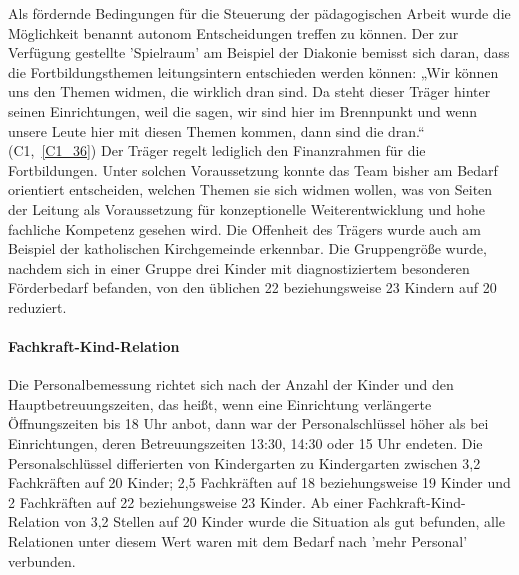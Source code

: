 Als fördernde Bedingungen für die Steuerung der pädagogischen Arbeit wurde die Möglichkeit benannt autonom Entscheidungen treffen zu können. 
Der zur Verfügung gestellte 'Spielraum' am Beispiel der Diakonie bemisst sich daran, dass die Fortbildungsthemen leitungsintern entschieden werden können: „Wir können uns den Themen widmen, die wirklich dran sind. Da steht dieser Träger hinter seinen Einrichtungen, weil die sagen, wir sind hier im Brennpunkt und wenn unsere Leute hier mit diesen Themen kommen, dann sind die dran.“ (C1,~\ref{C1_36}) Der Träger regelt lediglich den Finanzrahmen für die Fortbildungen. Unter solchen Voraussetzung konnte das Team bisher am Bedarf orientiert entscheiden, welchen Themen sie sich widmen wollen, was von Seiten der Leitung als Voraussetzung für konzeptionelle Weiterentwicklung und hohe fachliche Kompetenz gesehen wird. 
Die Offenheit des Trägers wurde auch am Beispiel der katholischen Kirchgemeinde erkennbar. Die Gruppengröße wurde, nachdem sich in einer Gruppe drei Kinder mit diagnostiziertem besonderen Förderbedarf befanden, von den üblichen 22 beziehungsweise 23 Kindern auf 20 reduziert. 

\paragraph{Fachkraft-Kind-Relation}
Die Personalbemessung richtet sich nach der Anzahl der Kinder und den Hauptbetreuungszeiten, das heißt, wenn eine Einrichtung verlängerte Öffnungszeiten bis 18 Uhr anbot, dann war der Personalschlüssel höher als bei Einrichtungen, deren Betreuungszeiten 13:30, 14:30 oder 15 Uhr endeten. Die Personalschlüssel differierten von Kindergarten zu Kindergarten zwischen 3,2 Fachkräften auf 20 Kinder; 2,5 Fachkräften auf 18 beziehungsweise 19 Kinder und 2 Fachkräften auf 22 beziehungsweise 23 Kinder. Ab einer Fachkraft-Kind-Relation von 3,2 Stellen auf 20 Kinder wurde die Situation als gut befunden, alle Relationen unter diesem Wert waren mit dem Bedarf nach 'mehr Personal' verbunden.     

